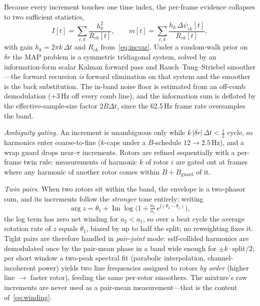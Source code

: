 \documentclass[journal]{IEEEtran}
\begin{document}
Because every increment touches one time index, the per-frame evidence
collapses to two sufficient statistics,
\begin{equation}
  I[t] = \sum_{c,k} \frac{h_k^2}{R_{ck}[t]}, \qquad
  m[t] = \sum_{c,k} \frac{h_k\,\Delta\psi_{ck}[t]}{R_{ck}[t]},
  \label{eq:infoform}
\end{equation}
with gain $h_k = 2\pi k\,\Delta t$ and $R_{ck}$ from~\eqref{eq:incvar}.
Under a random-walk prior on $\delta r$ the MAP problem is a symmetric
tridiagonal system, solved by an information-form scalar Kalman forward
pass and Rauch--Tung--Striebel smoother---the forward recursion \emph{is}
forward elimination on that system and the smoother is the back
substitution. The in-band noise floor is estimated from an off-comb
demodulation ($+3$\,Hz off every comb line), and the information sum is
deflated by the effective-sample-size factor $2B\Delta t$, since the
62.5\,Hz frame rate oversamples the band.

\emph{Ambiguity gating.} An increment is unambiguous only while
$k\,|\delta r|\,\Delta t < \tfrac12$ cycle, so harmonics enter
coarse-to-fine ($k$-caps under a $B$-schedule $12 \to 2.5$\,Hz), and a
wrap guard drops near-$\pi$ increments. Rotors are refined sequentially
with a per-frame twin rule: measurements of harmonic $k$ of rotor $i$ are
gated out at frames where any harmonic of another rotor comes within $B +
B_{\mathrm{guard}}$ of it.

\emph{Twin pairs.} When two rotors sit within the band, the envelope is a
two-phasor sum, and its increments follow the \emph{stronger} tone
entirely: writing
\begin{equation}
  \arg z = \theta_1 + \operatorname{Im}
  \log\!\big(1 + \tfrac{a_2}{a_1}\, e^{\mathrm{j}(\theta_2 -
  \theta_1)}\big),
  \label{eq:winding}
\end{equation}
the log term has zero net winding for $a_2 < a_1$, so over a beat cycle
the average rotation rate of $z$ equals $\dot\theta_1$, biased by up to
half the split; no reweighting fixes it. Tight pairs are therefore
handled in \emph{pair-joint} mode: self-collided harmonics are
demodulated once by the pair-mean phase in a band wide enough for $\pm k
\cdot \mathrm{split}/2$; per short window a two-peak spectral fit
(parabolic interpolation, channel-incoherent power) yields two line
frequencies assigned to rotors \emph{by order} (higher line $\to$ faster
rotor), feeding the same per-rotor smoothers. The mixture's raw
increments are never used as a pair-mean measurement---that is the
content of~\eqref{eq:winding}.
\end{document}
